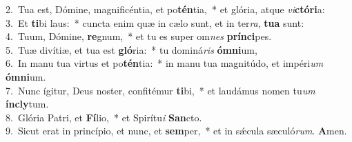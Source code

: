{2.~}Tua est, Dómine, magnificéntia, et po\textbf{tén}tia,~* et glória, atque \textit{vi}\textbf{ctó}\textbf{ri}a:\\
{3.~}Et \textbf{ti}bi laus:~* cuncta enim quæ in cælo sunt, et in ter\textit{ra}, \textbf{tu}\textbf{a} sunt:\\
{4.~}Tuum, Dómine, \textbf{re}gnum,~* et tu es super om\textit{nes} \textbf{prín}\textbf{ci}pes.\\
{5.~}Tuæ divítiæ, et tua est \textbf{gló}ria:~* tu dominá\textit{ris} \textbf{óm}\textbf{ni}um,\\
{6.~}In manu tua virtus et po\textbf{tén}tia:~* in manu tua magnitúdo, et impéri\textit{um} \textbf{óm}\textbf{ni}um.\\
{7.~}Nunc ígitur, Deus noster, confitémur \textbf{ti}bi,~* et laudámus nomen tu\textit{um} \textbf{ín}\textbf{cly}tum.\\
{8.~}Glória Patri, et \textbf{Fí}lio,~* et Spirítu\textit{i} \textbf{San}cto.\\
{9.~}Sicut erat in princípio, et nunc, et \textbf{sem}per,~* et in sǽcula sæculó\textit{rum}. \textbf{A}men.\\
